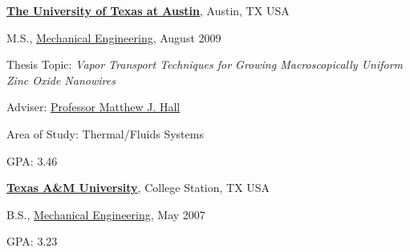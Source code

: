 \documentclass[10pt]{article}
\newenvironment{outerlist}[1][\enskip\textbullet]%
        {\begin{itemize}[#1]}{\end{itemize}%
         \vspace{-.6\baselineskip}}
\newenvironment{innerlist}[1][\enskip\textbullet]%
        {\begin{compactitem}[#1]}{\end{compactitem}}
\newcommand{\blankline}{\quad\pagebreak[2]}
\begin{document}
\blankline

\href{http://www.utexas.edu/}{\textbf{The University of Texas at Austin}}, Austin, TX USA
\begin{outerlist}
\item[] M.S.,
        \href{http://www.me.utexas.edu/}
             {Mechanical Engineering}, August 2009
        \begin{innerlist}
        \item Thesis Topic: \emph{Vapor Transport Techniques for
            Growing Macroscopically Uniform Zinc Oxide Nanowires} 
        \item Adviser:%
              \href{http://www.me.utexas.edu/directory/faculty/hall/matthew/33/}
                   {Professor Matthew J. Hall}
        \item Area of Study: Thermal/Fluids Systems
        \item GPA: 3.46
        \end{innerlist}
\end{outerlist}

\blankline

\href{http://www.tamu.edu/}{\textbf{Texas A\&M University}}, College Station, TX USA
\begin{outerlist}
\item[] B.S.,
        \href{http://www.mengr.tamu.edu/}{Mechanical Engineering}, May
        2007 
        \begin{innerlist}
        \item GPA: 3.23
        \end{innerlist}
\end{outerlist}
\end{document}
